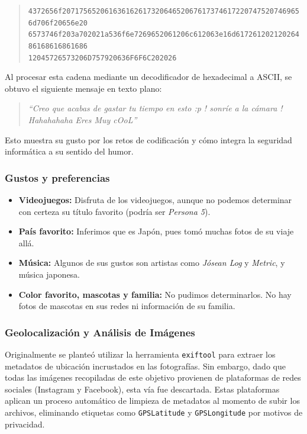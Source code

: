 \begin{quote}
\texttt{4372656f207175652061636162617320646520676173746172207475207469656d706f20656e20\\
6573746f203a702021a536f6e7269652061206c612063e16d61726120212026486168616861686\\
12045726573206D757920636F6F6C202026}
\end{quote}

Al procesar esta cadena mediante un decodificador de hexadecimal a ASCII, se obtuvo el siguiente mensaje en texto plano:
\begin{quote}
\textit{``Creo que acabas de gastar tu tiempo en esto :p ! sonríe a la cámara ! Hahahahaha Eres Muy cOoL''}
\end{quote}
Esto muestra su gusto por los retos de codificación y cómo integra la seguridad informática a su sentido del humor.

\subsubsection{Gustos y preferencias}
\begin{itemize}
    \item \textbf{Videojuegos:} Disfruta de los videojuegos, aunque no podemos determinar con certeza su título favorito (podría ser \textit{Persona 5}).
    \item \textbf{País favorito:} Inferimos que es Japón, pues tomó muchas fotos de su viaje allá.
    \item \textbf{Música:} Algunos de sus gustos son artistas como \textit{Jósean Log} y \textit{Metric}, y música japonesa.
    \item \textbf{Color favorito, mascotas y familia:} No pudimos determinarlos. No hay fotos de mascotas en sus redes ni información de su familia.
\end{itemize}

\subsubsection{Geolocalización y Análisis de Imágenes}

Originalmente se planteó utilizar la herramienta \texttt{exiftool} para extraer los metadatos de ubicación incrustados en las fotografías. Sin embargo, dado que todas las imágenes recopiladas de este objetivo provienen de plataformas de redes sociales (Instagram y Facebook), esta vía fue descartada. Estas plataformas aplican un proceso automático de limpieza de metadatos al momento de subir los archivos, eliminando etiquetas como \texttt{GPSLatitude} y \texttt{GPSLongitude} por motivos de privacidad.

